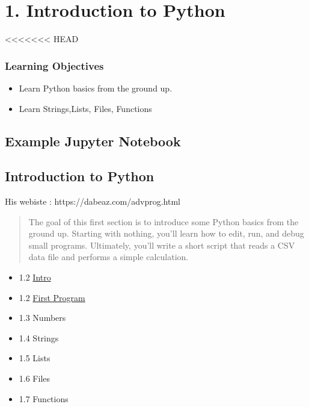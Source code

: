 \documentclass[
  letterpaper,
  DIV=11,
  numbers=noendperiod]{scrreprt}
\begin{document}
\part{1. Introduction to Python}

\hypertarget{learning-objectives}{%
<<<<<<< HEAD
\section*{Learning Objectives}\label{learning-objectives}}

\begin{itemize}
\item
  Learn Python basics from the ground up.
\item
  Learn Strings,Lists, Files, Functions
\end{itemize}

\hypertarget{example-jupyter-notebook}{%
\chapter{Example Jupyter Notebook}\label{example-jupyter-notebook}}

\hypertarget{introduction-to-python-1}{%
\chapter{Introduction to Python}\label{introduction-to-python-1}}

His webiste : https://dabeaz.com/advprog.html

\begin{quote}
The goal of this first section is to introduce some Python basics from
the ground up. Starting with nothing, you'll learn how to edit, run, and
debug small programs. Ultimately, you'll write a short script that reads
a CSV data file and performs a simple calculation.
\end{quote}

\begin{itemize}
\item
  1.2 \protect\hyperlink{Intro}{Intro}
\item
  1.2 \protect\hyperlink{firstprogram}{First Program}
\item
  1.3 Numbers
\item
  1.4 Strings
\item
  1.5 Lists
\item
  1.6 Files
\item
  1.7 Functions
\end{itemize}
\end{document}
